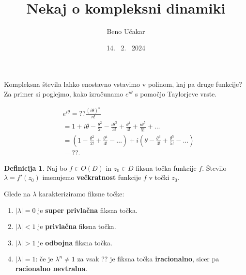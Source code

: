 \documentclass{beamer}
\title{Nekaj o kompleksni dinamiki}
\author{Beno Učakar}
\date{14. \ 2. \ 2024}
\institute{Fakulteta za matematiko in fiziko}
\theoremstyle{definition}
\newtheorem{definicija}{Definicija}
\begin{document}
\maketitle

\begin{frame}
    Kompleksna števila lahko enostavno vstavimo v polinom, kaj pa druge funkcije? 
    Za primer si poglejmo, kako izračunamo $e^{i\theta}$ s pomočjo Taylorjeve vrste.
    
    \begin{align*}
        & e^{i\theta} = ?? \frac{(i\theta)^n}{n!} \\
        & = 1 + i\theta - \frac{\theta^2}{2!} - \frac{i\theta^3}{3!} + \frac{\theta^4}{4!} + \frac{i\theta^5}{5!} + \ldots \\
        &  = \left( 1 - \frac{\theta^2}{2!} + \frac{\theta^4}{4!} - \ldots \right)  
          + i \left(\theta - \frac{\theta^3}{3!} + \frac{\theta^5}{5!} - \ldots \right) \\
        &   = ??.
    \end{align*}
       
\end{frame}

\begin{frame}

    \begin{definicija}
     Naj bo $f \in O(D)$ in $z_0 \in D$ fiksna točka funkcije $f$.
        Število $\lambda = f'(z_0)$ imenujemo \textbf{večkratnost} funkcije $f$ v točki $z_0$.
    \end{definicija}
   
    
        
    

    \begin{exampleblock}{Glede na $\lambda$ karakteriziramo fiksne točke:}
        \begin{enumerate} 
            \item $|\lambda| = 0$ je \textbf{super privlačna} fiksna točka.
            \item $|\lambda| < 1$ je \textbf{privlačna} fiksna točka.
            \item $|\lambda| > 1$ je \textbf{odbojna} fiksna točka.
            \item $|\lambda| = 1$: 
                če je $\lambda^n \neq 1$ za vsak ?? je fiksna točka \textbf{iracionalno},
                sicer pa \textbf{racionalno nevtralna}.
        \end{enumerate}
    \end{exampleblock}
\end{frame}
\end{document}
